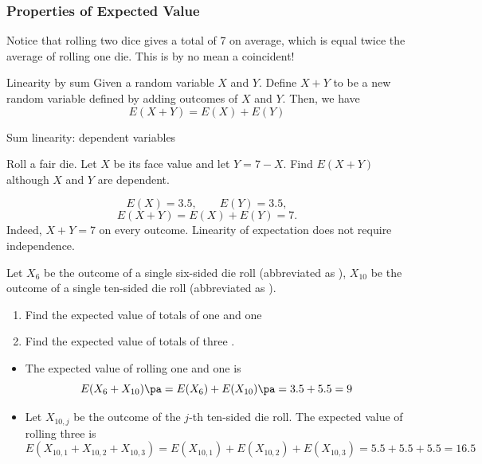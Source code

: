 \begin{frame}
\frametitle{Properties of Expected Value}
Notice that rolling two dice gives a total of 7 on average, which is equal twice the average of rolling one die. This is by no mean a coincident!
\begin{thm}{Linearity by sum}{}
Given a random variable $X$ and $Y$. Define $X + Y$ to be a new random variable defined by adding outcomes of $X$ and $Y$. Then, we have
\[E(X+Y) = E(X) + E(Y)\]
\end{thm}
\end{frame}
\begin{frame}[t]{Sum linearity: dependent variables}
\small
\begin{ex}
Roll a fair die. Let $X$ be its face value and let $Y=7-X$. Find $E(X+Y)$ although $X$ and $Y$ are dependent.
\end{ex}
\begin{sol}
\[E(X)=3.5,\qquad E(Y)=3.5,\]\[E(X+Y)=E(X)+E(Y)=7.\] Indeed, $X+Y=7$ on every outcome. Linearity of expectation does not require independence.
\end{sol}
\end{frame}



\begin{frame}[t]
\begin{ex}
Let $X_6$ be the outcome of a single six-sided die roll (abbreviated as ), $X_{10}$ be the outcome of a single ten-sided die roll (abbreviated as ).
\begin{enumerate}
\item Find the expected value of totals of one  and one 
\item Find the expected value of totals of three .
\end{enumerate}
\end{ex}
\begin{sol}
\begin{itemize}
\item The expected value of rolling one  and one  is \pa
\[E(X_6 +X_{10}) \pa = E(X_6) + E(X_{10}) \pa = 3.5 + 5.5 = 9\]
\item Let $X_{10,j}$ be the outcome of the $j$-th ten-sided die roll. The expected value of rolling three  is
\[E(X_{10,1} + X_{10,2} + X_{10,3}) = E(X_{10,1}) + E(X_{10,2}) + E(X_{10,3}) = 5.5 + 5.5 + 5.5 = 16.5\]
\end{itemize}
\end{sol}
\end{frame}

